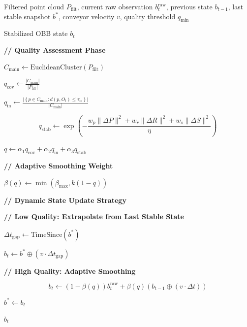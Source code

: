 \begin{algorithm}[t]
\caption{Consistency-Aware OBB Stabilization (CAOS)}
\label{alg:caos}
\begin{algorithmic}[1]

\Require Filtered point cloud $P_{\text{filt}}$,
current raw observation $b_t^{\text{raw}}$,
previous state $b_{t-1}$,
last stable snapshot $b^{*}$,
conveyor velocity $v$,
quality threshold $q_{\text{min}}$

\Ensure Stabilized OBB state $b_t$

\State \textbf{// Quality Assessment Phase}

\State
$C_{\text{main}}
\gets
\mathrm{EuclideanCluster}(P_{\text{filt}})$

\State
$q_{\text{cov}}
\gets
\frac{|C_{\text{main}}|}{|P_{\text{filt}}|}$

\State
$q_{\text{in}}
\gets
\frac{
\left|
\left\{
p\in C_{\text{main}} :
d(p,O_t)\le \tau_{\text{in}}
\right\}
\right|
}
{|C_{\text{main}}|}
$

\State
\[
q_{\text{stab}}
\gets
\exp\!\left(
-\frac{
w_p\|\Delta P\|^2
+
w_r\|\Delta R\|^2
+
w_s\|\Delta S\|^2
}
{\eta}
\right)
\]

\State
$q
\gets
\alpha_1 q_{\text{cov}}
+
\alpha_2 q_{\text{in}}
+
\alpha_3 q_{\text{stab}}$

\State \textbf{// Adaptive Smoothing Weight}

\State
$\beta(q)
\gets
\min\!\left(
\beta_{\text{max}},
k(1-q)
\right)$

\State \textbf{// Dynamic State Update Strategy}


    \State \textbf{// Low Quality: Extrapolate from Last Stable State}

    \State
    $\Delta t_{\text{gap}}
    \gets
    \mathrm{TimeSince}(b^{*})$

    \State
    $b_t
    \gets
    b^{*}
    \oplus
    \left(v\cdot\Delta t_{\text{gap}}\right)$

\Else

    \State \textbf{// High Quality: Adaptive Smoothing}

    \State {}

    \State
    \[
    b_t
    \gets
    \left(1-\beta(q)\right)b_t^{\text{raw}}
    +
    \beta(q)
    \left(
    b_{t-1}
    \oplus
    (v\cdot\Delta t)
    \right)
    \]

    \State
    $b^{*} \gets b_t$

\EndIf

\State \Return $b_t$

\end{algorithmic}
\end{algorithm}

